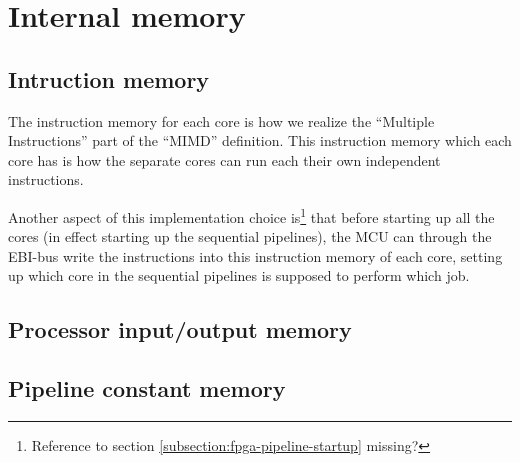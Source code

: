 \section{Internal memory}\label{section:fpga-internal-memory}

\subsection{Intruction memory}

The instruction memory for each core is how we realize the ``Multiple
Instructions'' part of the ``MIMD'' definition. This instruction memory which
each core has is how the separate cores can run each their own independent
instructions.

Another aspect of this implementation choice is\footnote{Reference to section
\ref{subsection:fpga-pipeline-startup} missing?} that before starting up all the
cores (in effect starting up the sequential pipelines), the MCU can through the
EBI-bus write the instructions into this instruction memory of each core,
setting up which core in the sequential pipelines is supposed to perform which
job.

\subsection{Processor input/output memory}

\subsection{Pipeline constant memory}
